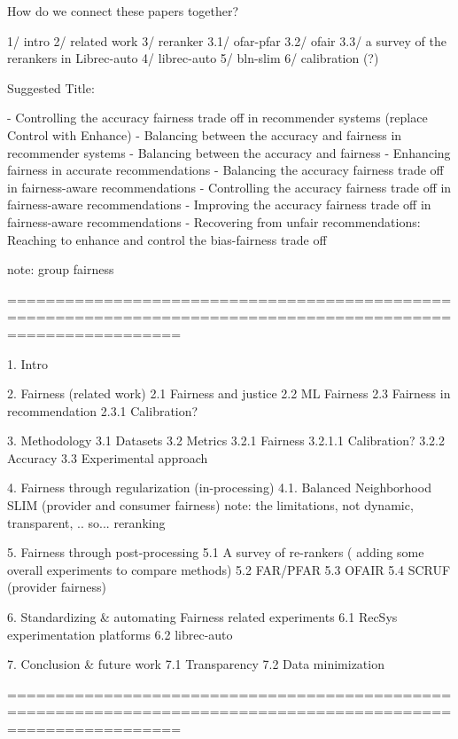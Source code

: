 
How do we connect these papers together?

1/ intro
2/ related work
3/ reranker
    3.1/ ofar-pfar
    3.2/ ofair
    3.3/ a survey of the rerankers in Librec-auto
4/ librec-auto
5/ bln-slim
6/ calibration (?)



Suggested Title: 

- Controlling the accuracy fairness trade off in recommender systems (replace Control with Enhance)
- Balancing between the accuracy and fairness in recommender systems
- Balancing between the accuracy and fairness
- Enhancing fairness in accurate recommendations
- Balancing the accuracy fairness trade off in fairness-aware recommendations
- Controlling the accuracy fairness trade off in fairness-aware recommendations
- Improving the accuracy fairness trade off in fairness-aware recommendations
- Recovering from unfair recommendations: Reaching to enhance and control the bias-fairness trade off


note: group fairness

==============================================================================================================

1. Intro

2. Fairness (related work)
    2.1 Fairness and justice
    2.2 ML Fairness
    2.3 Fairness in recommendation
        2.3.1 Calibration?
    
3. Methodology
    3.1 Datasets
    3.2 Metrics
        3.2.1 Fairness
            3.2.1.1 Calibration?
        3.2.2 Accuracy
    3.3 Experimental approach

4. Fairness through regularization (in-processing)
    4.1. Balanced Neighborhood SLIM
    (provider and consumer fairness)
    note: the limitations, not dynamic, transparent, .. so... reranking
    
5. Fairness through post-processing
    5.1 A survey of re-rankers ( adding some overall experiments to compare methods)
    5.2 FAR/PFAR
    5.3 OFAIR
    5.4 SCRUF
    (provider fairness)

6. Standardizing & automating Fairness related experiments
    6.1 RecSys experimentation platforms
    6.2 librec-auto

7. Conclusion & future work
    7.1 Transparency
    7.2 Data minimization


==============================================================================================================



